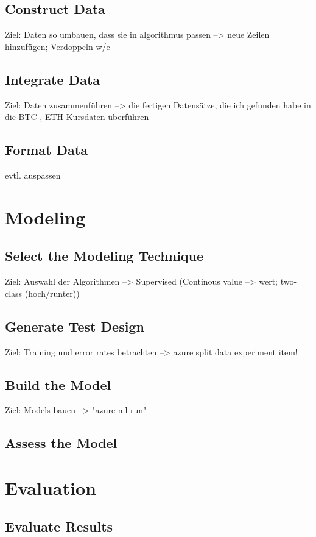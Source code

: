 \subsection{Construct Data}
Ziel: Daten so umbauen, dass sie in algorithmus passen
--> neue Zeilen hinzufügen; Verdoppeln w/e

\subsection{Integrate Data}
Ziel: Daten zusammenführen
--> die fertigen Datensätze, die ich gefunden habe in die BTC-, ETH-Kursdaten überführen

\subsection{Format Data}
evtl. auspassen

\section{Modeling}
\subsection{Select the Modeling Technique}
Ziel: Auswahl der Algorithmen
--> Supervised (Continous value --> wert; two-class (hoch/runter))

\subsection{Generate Test Design}
Ziel: Training und error rates betrachten
--> azure split data experiment item!

\subsection{Build the Model}
Ziel: Models bauen
--> "azure ml run"

\subsection{Assess the Model}


\section{Evaluation}
\subsection{Evaluate Results}
